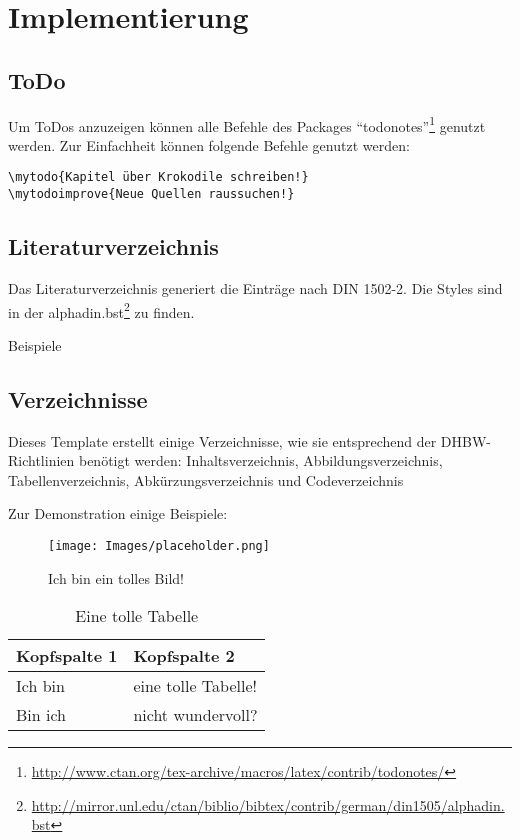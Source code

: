 \chapter{Implementierung}

\section{ToDo}

Um ToDos anzuzeigen können alle Befehle des Packages \enquote{todonotes}\footnote{\url{http://www.ctan.org/tex-archive/macros/latex/contrib/todonotes/}} genutzt werden.
Zur Einfachheit können folgende Befehle genutzt werden:

\begin{verbatim}
\mytodo{Kapitel über Krokodile schreiben!}
\mytodoimprove{Neue Quellen raussuchen!}
\end{verbatim}


\section{Literaturverzeichnis}

Das Literaturverzeichnis generiert die Einträge nach DIN 1502-2. Die Styles sind in der alphadin.bst\footnote{\url{http://mirror.unl.edu/ctan/biblio/bibtex/contrib/german/din1505/alphadin.bst}} zu finden.

Beispiele \cite{web:wiki:latex,book:komascript}

\section{Verzeichnisse}

Dieses Template erstellt einige Verzeichnisse, wie sie entsprechend der DHBW-Richtlinien benötigt werden: Inhaltsverzeichnis, Abbildungsverzeichnis, Tabellenverzeichnis, Abkürzungsverzeichnis und Codeverzeichnis

Zur Demonstration einige Beispiele:

\begin{figure}[H]
\centering
\texttt{[image: Images/placeholder.png]}
\caption{Ich bin ein tolles Bild!}
\end{figure}

\begin{table}[H]
\centering
\begin{tabular}{ll}
	\textbf{Kopfspalte 1} & \textbf{Kopfspalte 2} \\ \hline\hline
	Ich bin               & eine tolle Tabelle!   \\ \hline
	Bin ich               & nicht wundervoll?
\end{tabular}
\caption{Eine tolle Tabelle}
\end{table}

